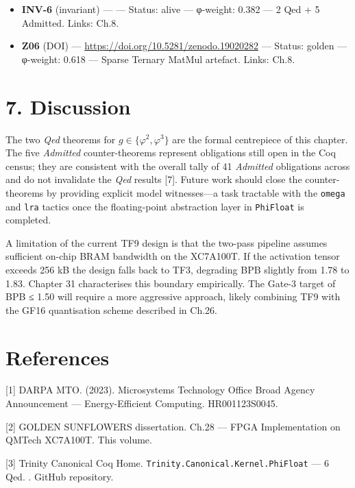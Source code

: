 \begin{itemize}
\tightlist
\item
  \textbf{INV-6} (invariant) ---
  --- Status: alive --- φ-weight: 0.382 --- 2 Qed
  + 5 Admitted. Links: Ch.8.
\item
  \textbf{Z06} (DOI) ---
  \url{https://doi.org/10.5281/zenodo.19020282} ---
  Status: golden --- φ-weight: 0.618 --- Sparse
  Ternary MatMul artefact. Links: Ch.8.
\end{itemize}

\section{7. Discussion}\label{fa_08:discussion}

The two \emph{Qed} theorems for
\(g \in \{\varphi^2, \varphi^3\}\) are the formal
centrepiece of this chapter. The five
\emph{Admitted} counter-theorems represent
obligations still open in the Coq census; they are
consistent with the overall tally of 41
\emph{Admitted} obligations across
 and do not
invalidate the \emph{Qed} results [7]. Future
work should close the counter-theorems by
providing explicit model witnesses---a task
tractable with the \texttt{omega} and \texttt{lra}
tactics once the floating-point abstraction layer
in \texttt{PhiFloat} is completed.

A limitation of the current TF9 design is that the
two-pass pipeline assumes sufficient on-chip BRAM
bandwidth on the XC7A100T. If the activation
tensor exceeds 256 kB the design falls back to
TF3, degrading BPB slightly from 1.78 to 1.83.
Chapter 31 characterises this boundary
empirically. The Gate-3 target of BPB ≤ 1.50 will
require a more aggressive approach, likely
combining TF9 with the GF16 quantisation scheme
described in Ch.26.

\section{References}\label{fa_08:references}

[1] DARPA MTO. (2023). Microsystems Technology
Office Broad Agency Announcement ---
Energy-Efficient Computing. HR001123S0045.

[2] GOLDEN SUNFLOWERS dissertation. Ch.28 ---
FPGA Implementation on QMTech XC7A100T. This
volume.

[3] Trinity Canonical Coq Home.
\texttt{Trinity.Canonical.Kernel.PhiFloat} --- 6
Qed. .
GitHub repository.

